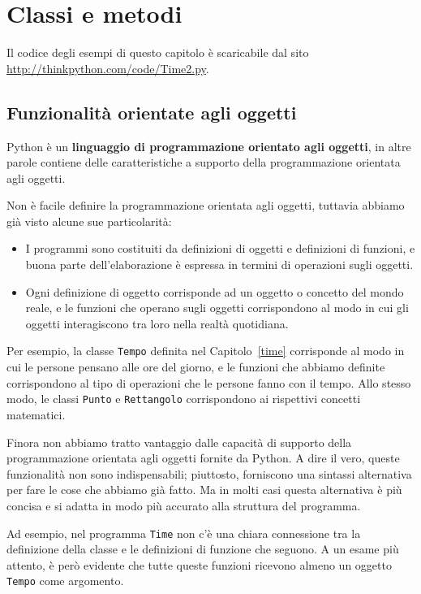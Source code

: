 \documentclass[10pt]{book}
\begin{document}
\chapter{Classi e metodi}

Il codice degli esempi di questo capitolo è scaricabile dal sito
\url{http://thinkpython.com/code/Time2.py}.

\section{Funzionalità orientate agli oggetti}

Python è un {\bf linguaggio di programmazione orientato agli oggetti}, in altre parole contiene delle caratteristiche a supporto della programmazione orientata agli oggetti.

Non è facile definire la programmazione orientata agli oggetti, tuttavia abbiamo già visto alcune sue particolarità:

\begin{itemize}

\item I programmi sono costituiti da definizioni di oggetti e definizioni di funzioni, e buona parte dell'elaborazione è espressa in termini di operazioni sugli oggetti.

\item Ogni definizione di oggetto corrisponde ad un oggetto o concetto del mondo reale, e le funzioni che operano sugli oggetti corrispondono al modo in cui gli oggetti interagiscono tra loro nella realtà quotidiana.

\end{itemize}

Per esempio, la classe {\tt Tempo} definita nel Capitolo~\ref{time}
corrisponde al modo in cui le persone pensano alle ore del giorno, e le funzioni che abbiamo definite corrispondono al tipo di operazioni che le persone fanno con il tempo. Allo stesso modo, le classi {\tt Punto} e {\tt Rettangolo} corrispondono ai rispettivi concetti matematici.

Finora non abbiamo tratto vantaggio dalle capacità di supporto della   programmazione orientata agli oggetti fornite da Python. A dire il vero, queste funzionalità non sono indispensabili; piuttosto, forniscono una sintassi alternativa per fare le cose che abbiamo già fatto. Ma in molti casi questa alternativa è più concisa e si adatta in modo più accurato alla struttura del programma.

Ad esempio, nel programma {\tt Time} non c'è una chiara connessione tra la definizione della classe e le definizioni di funzione che seguono. A un esame più attento, è però evidente che tutte queste funzioni ricevono almeno un oggetto {\tt Tempo} come argomento.
\end{document}
